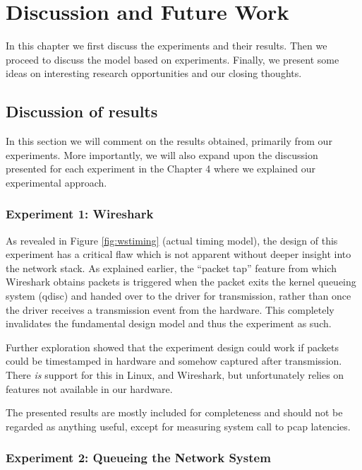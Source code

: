 
\chapter{Discussion and Future Work}

In this chapter we first discuss the experiments and their results. Then we
proceed to discuss the model based on experiments. Finally, we present some
ideas on interesting research opportunities and our closing thoughts.

\section{Discussion of results}

In this section we will comment on the results obtained, primarily from our
experiments. More importantly, we will also expand upon the discussion
presented for each experiment in the Chapter 4 where we explained our
experimental approach.

\subsection{Experiment 1: Wireshark}

As revealed in Figure \ref{fig:wstiming} (actual timing model), the design of
this experiment has a critical flaw which is not apparent without deeper
insight into the network stack. As explained earlier, the ``packet tap''
feature from which Wireshark obtains packets is triggered when the packet
exits the kernel queueing system (qdisc) and handed over to the driver for
transmission, rather than once the driver receives a transmission event from
the hardware. This completely invalidates the fundamental design model and
thus the experiment as such.

Further exploration showed that the experiment design could work if packets
could be timestamped in hardware and somehow captured after transmission.
There \emph{is} support for this in Linux, and Wireshark, but unfortunately
relies on features not available in our hardware.

The presented results are mostly included for completeness and should not be
regarded as anything useful, except for measuring system call to pcap
latencies.

\subsection{Experiment 2: Queueing the Network System}

